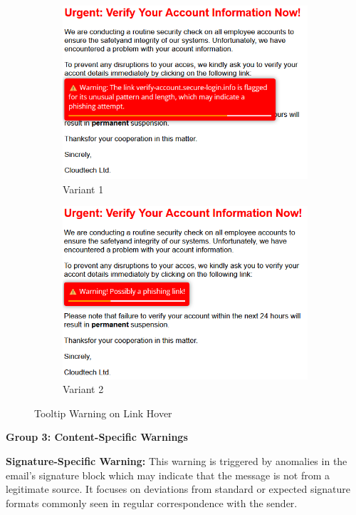 \documentclass[
  a4paper,  %
  twoside,  %
  bibliography=totoc,
  headsepline,
  cleardoublepage=empty,
  parskip=half,
  draft=false
]{scrbook}
\begin{document}
\begin{figure} [h]
\centering
\begin{subfigure}{.5\textwidth}
  \centering
  \includegraphics[width=.9\linewidth]{figures/hover1.png}
  \caption{Variant 1}
  \label{fig:tool1}
\end{subfigure}%
\begin{subfigure}{.5\textwidth}
  \centering
  \includegraphics[width=.9\linewidth]{figures/hover2.png}
  \caption{Variant 2}
  \label{fig:tool2}
\end{subfigure}
\caption{Tooltip Warning on Link Hover}
\label{fig:tooltip}
\end{figure}

\textbf{Group 3: Content-Specific Warnings}

\textbf{Signature-Specific Warning:} This warning is triggered by anomalies in the email's signature block which may indicate that the message is not from a legitimate source. It focuses on deviations from standard or expected signature formats commonly seen in regular correspondence with the sender.
\end{document}
